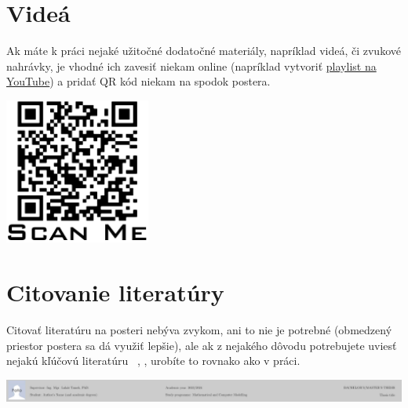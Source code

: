 \documentclass[portrait,a0]{a0poster}
\begin{document}
\begin{multicols}{3}
	
	\section*{Videá}
	
	Ak máte k práci nejaké užitočné dodatočné materiály, napríklad videá, či zvukové nahrávky, je vhodné ich zavesiť niekam online (napríklad vytvoriť \href{https://www.youtube.com/playlist?list=PLI7npCkiqdtxGtS1VIZW3aDIIJM1EJoFR}{playlist na YouTube}) a pridať QR kód niekam na spodok postera.
	\begin{center}
		\includegraphics[height=4.8cm]{figures/QRcode}
		\label{fig:qr}
	\end{center}
	
	
	\section*{Citovanie literatúry}
	
	Citovať literatúru na posteri nebýva zvykom, ani to nie je potrebné (obmedzený priestor postera sa dá využiť lepšie), ale ak z nejakého dôvodu potrebujete uviesť nejakú kľúčovú literatúru ~\cite{eymard}, \cite{Handlovicova}, urobíte to rovnako ako v práci.
	
	\printbibliography
	
	\end{multicols}
	\vfill

	\centerline{\includegraphics[width=\paperwidth]{footer/footer.pdf}}
\end{document}
